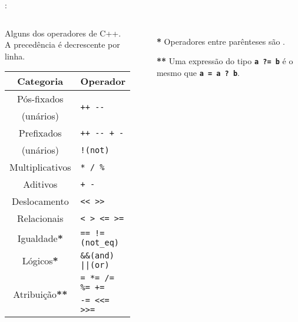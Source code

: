 \begin{frame}{\insertsection: \insertsubsection}
  \begin{columns}
    \begin{block}{\centering Alguns dos operadores de C++.\\{\small A precedência é decrescente por linha.}}
      \centering
      \begin{tabular}{|c|l|}                                        \hline
        \textbf{Categoria} & \textbf{Operador}                   \\ \hline
        Pós-fixados        & \multirow{2}{*}{\texttt{++ {-}{-}}} \\
        (unários)          &                                     \\ \hline
        Prefixados         & \texttt{++ {-}{-} + -} \\
        (unários)          & \texttt{!(not)}                    \\ \hline
        Multiplicativos    & \texttt{* / \%}                     \\ \hline
        Aditivos           & \texttt{+ -}                        \\ \hline
        Deslocamento       & \texttt{{<}{<} {>}{>}}              \\ \hline
        Relacionais        & \texttt{< > <= >=}                  \\ \hline
        Igualdade\textcolor{CustomOrange}{\textbf{*}} & \texttt{== !=(not\_eq)} \\ \hline
        Lógicos\textcolor{CustomOrange}{\textbf{*}} & \texttt{\&\&(and) ||(or)} \\ \hline
        \multirow{2}{*}{Atribuição\textcolor{CustomOrange}{\textbf{**}}} & \texttt{= *= /= \%= +=} \\
                           & \texttt{-= <{<}= >{>}=}             \\ \hline
      \end{tabular}
    \end{block}

    \begin{itemize}
    \item[\textbf{*}] Operadores entre parênteses são .
    \item[\textbf{**}] Uma expressão do tipo \textbf{\texttt{a~?=~b}} é o mesmo que \textbf{\texttt{a~=~a~?~b}}.
    \end{itemize}
  \end{columns}
\end{frame}


